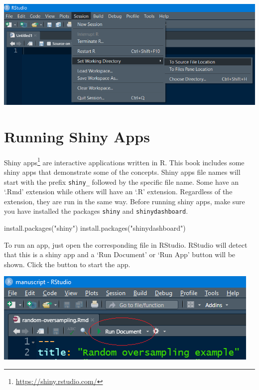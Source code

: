 \documentclass[
  11pt,
]{krantz}
\newenvironment{Shaded}{\begin{snugshade}}{\end{snugshade}}
\newcommand{\FunctionTok}[1]{\textcolor[rgb]{0,0,0}{#1}}
\newcommand{\NormalTok}[1]{#1}
\newcommand{\StringTok}[1]{\textcolor[rgb]{0.5,0.5,0.5}{#1}}
\begin{document}
\begin{center}\includegraphics[width=0.8\linewidth]{images/set_wd} \end{center}

\hypertarget{running-shiny-apps}{%
\section{Running Shiny Apps}\label{running-shiny-apps}}

Shiny apps\footnote{\url{https://shiny.rstudio.com/}} are interactive applications written in R. This book includes some shiny apps that demonstrate some of the concepts. Shiny apps file names will start with the prefix \texttt{shiny\_} followed by the specific file name. Some have an `.Rmd' extension while others will have an `.R' extension. Regardless of the extension, they are run in the same way. Before running shiny apps, make sure you have installed the packages \texttt{shiny} and \texttt{shinydashboard}.

\begin{Shaded}
\begin{Highlighting}[]
\FunctionTok{install.packages}\NormalTok{(}\StringTok{"shiny"}\NormalTok{)}
\FunctionTok{install.packages}\NormalTok{(}\StringTok{"shinydashboard"}\NormalTok{)}
\end{Highlighting}
\end{Shaded}

To run an app, just open the corresponding file in RStudio. RStudio will detect that this is a shiny app and a `Run Document' or `Run App' button will be shown. Click the button to start the app.

\begin{center}\includegraphics[width=0.5\linewidth]{images/runDocumnet} \end{center}
\end{document}
